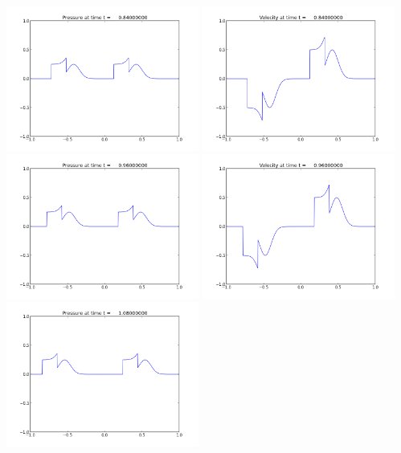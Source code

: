 \documentclass[11pt]{article}
\begin{document}
\vskip 10pt 
\includegraphics[width=0.475\textwidth]{frame0007fig1.png}
\includegraphics[width=0.475\textwidth]{frame0007fig2.png}
\vskip 10pt 
\includegraphics[width=0.475\textwidth]{frame0008fig1.png}
\includegraphics[width=0.475\textwidth]{frame0008fig2.png}
\vskip 10pt 
\includegraphics[width=0.475\textwidth]{frame0009fig1.png}
\end{document}

